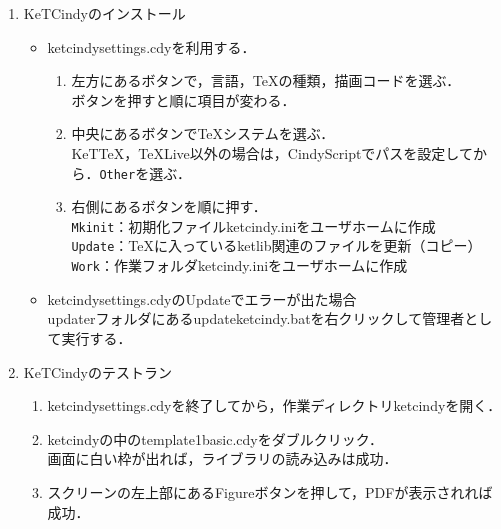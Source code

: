 \documentclass{ujarticle}
\begin{document}
\begin{enumerate}[\bf\large 1.]
\item KeTCindyのインストール
\begin{itemize}
\item ketcindysettings.cdyを利用する．
\begin{enumerate}[(1)]
\item 左方にあるボタンで，言語，TeXの種類，描画コードを選ぶ．\\
\hspace*{10mm}ボタンを押すと順に項目が変わる．
\item 中央にあるボタンでTeXシステムを選ぶ．\\
\hspace*{10mm}KeTTeX，TeXLive以外の場合は，CindyScriptでパスを設定してから．\verb|Other|を選ぶ．
\item 右側にあるボタンを順に押す．\\
\hspace*{10mm}\verb|Mkinit|：初期化ファイルketcindy.iniをユーザホームに作成\\
\hspace*{10mm}\verb|Update|：TeXに入っているketlib関連のファイルを更新（コピー）\\
\hspace*{10mm}\verb|Work|：作業フォルダketcindy.iniをユーザホームに作成
\end{enumerate}
\item ketcindysettings.cdyのUpdateでエラーが出た場合\\
\hspace*{10mm}updaterフォルダにあるupdateketcindy.batを右クリックして管理者として実行する．
\end{itemize}

\item KeTCindyのテストラン
    \begin{enumerate}[(1)]
    \item ketcindysettings.cdyを終了してから，作業ディレクトリketcindyを開く．
    \item ketcindyの中のtemplate1basic.cdyをダブルクリック．\\
      \hspace*{10mm}画面に白い枠が出れば，ライブラリの読み込みは成功．
    \item スクリーンの左上部にあるFigureボタンを押して，PDFが表示されれば成功．
  \end{enumerate}


\end{enumerate}
\end{document}
